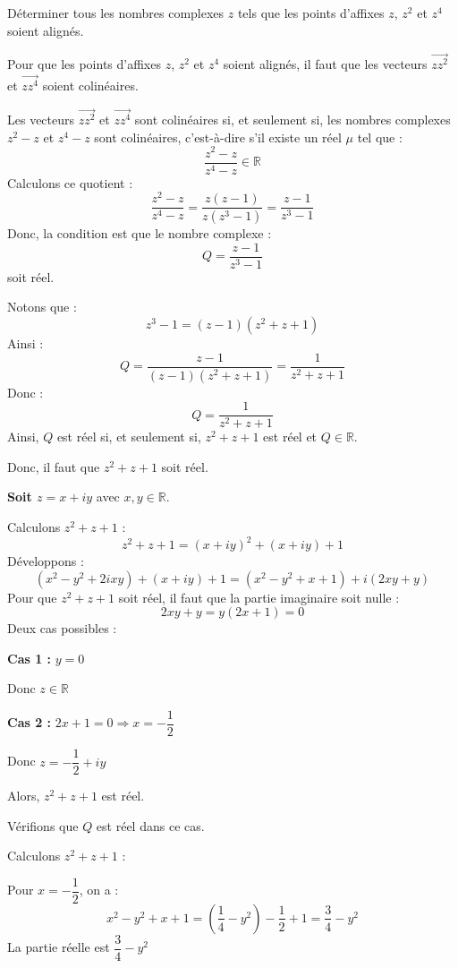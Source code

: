\documentclass[a4paper,12pt]{article}
\begin{document}
\begin{tcolorbox}[title={Exercice 12 - {[}Calculer, Chercher{]}}]
Déterminer tous les nombres complexes \( z \) tels que les points d’affixes \( z \), \( z^2 \) et \( z^4 \) soient alignés.
\end{tcolorbox}

\begin{solutionbox}
Pour que les points d'affixes \( z \), \( z^2 \) et \( z^4 \) soient alignés, il faut que les vecteurs \( \overrightarrow{z z^2} \) et \( \overrightarrow{z z^4} \) soient colinéaires.

Les vecteurs \( \overrightarrow{z z^2} \) et \( \overrightarrow{z z^4} \) sont colinéaires si, et seulement si, les nombres complexes \( z^2 - z \) et \( z^4 - z \) sont colinéaires, c'est-à-dire s'il existe un réel \( \mu \) tel que :
\[
\dfrac{z^2 - z}{z^4 - z} \in \mathbb{R}
\]
Calculons ce quotient :
\[
\dfrac{z^2 - z}{z^4 - z} = \dfrac{z(z - 1)}{z(z^3 - 1)} = \dfrac{z - 1}{z^3 - 1}
\]
Donc, la condition est que le nombre complexe :
\[
Q = \dfrac{z - 1}{z^3 - 1}
\]
soit réel.

Notons que :
\[
z^3 - 1 = (z - 1)(z^2 + z + 1)
\]
Ainsi :
\[
Q = \dfrac{z - 1}{(z - 1)(z^2 + z + 1)} = \dfrac{1}{z^2 + z + 1}
\]
Donc :
\[
Q = \dfrac{1}{z^2 + z + 1}
\]
Ainsi, \( Q \) est réel si, et seulement si, \( z^2 + z + 1 \) est réel et \( Q \in \mathbb{R} \).

Donc, il faut que \( z^2 + z + 1 \) soit réel.

\textbf{Soit \( z = x + i y \)} avec \( x, y \in \mathbb{R} \).

Calculons \( z^2 + z + 1 \) :
\[
z^2 + z + 1 = (x + i y)^2 + (x + i y) + 1
\]
Développons :
\[
(x^2 - y^2 + 2i x y) + (x + i y) + 1 = (x^2 - y^2 + x + 1) + i (2 x y + y)
\]
Pour que \( z^2 + z + 1 \) soit réel, il faut que la partie imaginaire soit nulle :
\[
2 x y + y = y (2 x + 1) = 0
\]
Deux cas possibles :

\textbf{Cas 1 :} \( y = 0 \)

Donc \( z \in \mathbb{R} \)

\textbf{Cas 2 :} \( 2 x + 1 = 0 \Rightarrow x = -\dfrac{1}{2} \)

Donc \( z = -\dfrac{1}{2} + i y \)

Alors, \( z^2 + z + 1 \) est réel.

Vérifions que \( Q \) est réel dans ce cas.

Calculons \( z^2 + z + 1 \) :

Pour \( x = -\dfrac{1}{2} \), on a :
\[
x^2 - y^2 + x + 1 = \left( \dfrac{1}{4} - y^2 \right) - \dfrac{1}{2} + 1 = \dfrac{3}{4} - y^2
\]
La partie réelle est \( \dfrac{3}{4} - y^2 \)


\end{solutionbox}
\end{document}
